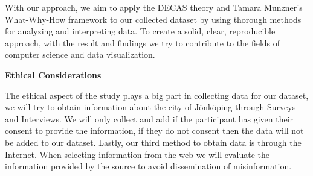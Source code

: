 With our approach, we aim to apply the DECAS theory and Tamara Munzner’s What-Why-How framework to our collected dataset by using thorough methods for analyzing and interpreting data. To create a solid, clear, reproducible approach, with the result and findings we try to contribute to the fields of computer science and data visualization.


\textbf{Ethical Considerations}

The ethical aspect of the study plays a big part in collecting data for our dataset, we will try to obtain information about the city of Jönköping through Surveys and Interviews. We will only collect and add if the participant has given their consent to provide the information, if they do not consent then the data will not be added to our dataset. Lastly, our third method to obtain data is through the Internet. When selecting information from the web we will evaluate the information provided by the source to avoid dissemination of misinformation. 


